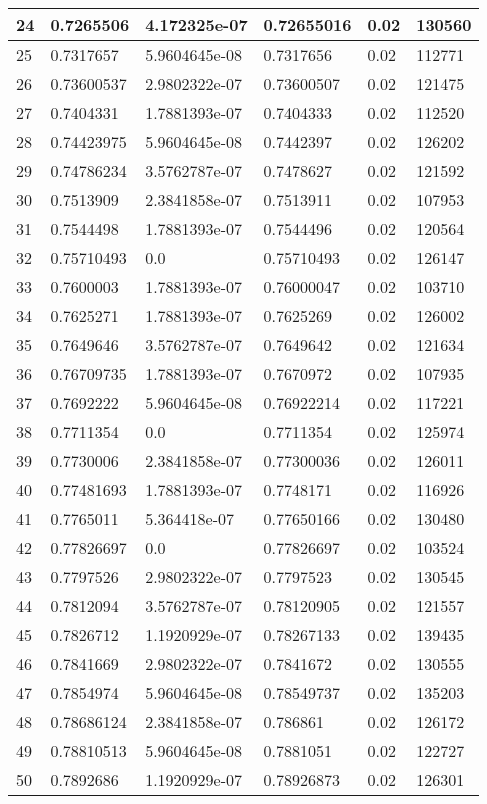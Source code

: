 \begin{longtable}{|l|l|l|l|l|l|}
24 & 0.7265506 & 4.172325e-07 & 0.72655016 & 0.02 & 130560 \\ \hline 
25 & 0.7317657 & 5.9604645e-08 & 0.7317656 & 0.02 & 112771 \\ \hline 
26 & 0.73600537 & 2.9802322e-07 & 0.73600507 & 0.02 & 121475 \\ \hline 
27 & 0.7404331 & 1.7881393e-07 & 0.7404333 & 0.02 & 112520 \\ \hline 
28 & 0.74423975 & 5.9604645e-08 & 0.7442397 & 0.02 & 126202 \\ \hline 
29 & 0.74786234 & 3.5762787e-07 & 0.7478627 & 0.02 & 121592 \\ \hline 
30 & 0.7513909 & 2.3841858e-07 & 0.7513911 & 0.02 & 107953 \\ \hline 
31 & 0.7544498 & 1.7881393e-07 & 0.7544496 & 0.02 & 120564 \\ \hline 
32 & 0.75710493 & 0.0 & 0.75710493 & 0.02 & 126147 \\ \hline 
33 & 0.7600003 & 1.7881393e-07 & 0.76000047 & 0.02 & 103710 \\ \hline 
34 & 0.7625271 & 1.7881393e-07 & 0.7625269 & 0.02 & 126002 \\ \hline 
35 & 0.7649646 & 3.5762787e-07 & 0.7649642 & 0.02 & 121634 \\ \hline 
36 & 0.76709735 & 1.7881393e-07 & 0.7670972 & 0.02 & 107935 \\ \hline 
37 & 0.7692222 & 5.9604645e-08 & 0.76922214 & 0.02 & 117221 \\ \hline 
38 & 0.7711354 & 0.0 & 0.7711354 & 0.02 & 125974 \\ \hline 
39 & 0.7730006 & 2.3841858e-07 & 0.77300036 & 0.02 & 126011 \\ \hline 
40 & 0.77481693 & 1.7881393e-07 & 0.7748171 & 0.02 & 116926 \\ \hline 
41 & 0.7765011 & 5.364418e-07 & 0.77650166 & 0.02 & 130480 \\ \hline 
42 & 0.77826697 & 0.0 & 0.77826697 & 0.02 & 103524 \\ \hline 
43 & 0.7797526 & 2.9802322e-07 & 0.7797523 & 0.02 & 130545 \\ \hline 
44 & 0.7812094 & 3.5762787e-07 & 0.78120905 & 0.02 & 121557 \\ \hline 
45 & 0.7826712 & 1.1920929e-07 & 0.78267133 & 0.02 & 139435 \\ \hline 
46 & 0.7841669 & 2.9802322e-07 & 0.7841672 & 0.02 & 130555 \\ \hline 
47 & 0.7854974 & 5.9604645e-08 & 0.78549737 & 0.02 & 135203 \\ \hline 
48 & 0.78686124 & 2.3841858e-07 & 0.786861 & 0.02 & 126172 \\ \hline 
49 & 0.78810513 & 5.9604645e-08 & 0.7881051 & 0.02 & 122727 \\ \hline 
50 & 0.7892686 & 1.1920929e-07 & 0.78926873 & 0.02 & 126301 \\ \hline 
\end{longtable}